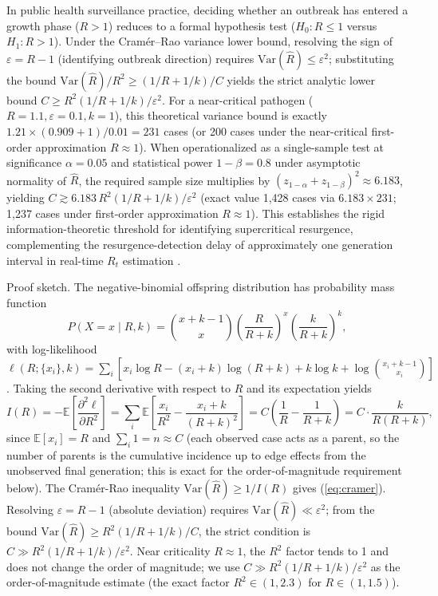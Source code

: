 \documentclass[review]{elsarticle}
\theoremstyle{plain}
\theoremstyle{definition}
\begin{document}
In public health surveillance practice, deciding whether an outbreak has entered a growth phase ($R>1$) reduces to a formal hypothesis test ($H_0: R \leq 1$ versus $H_1: R > 1$). Under the Cram\'er--Rao variance lower bound, resolving the sign of $\varepsilon = R - 1$ (identifying outbreak direction) requires $\text{Var}(\hat{R}) \le \varepsilon^2$; substituting the bound $\text{Var}(\hat{R})/R^2 \ge (1/R + 1/k)/C$ yields the strict analytic lower bound $C \ge R^2(1/R+1/k)/\varepsilon^2$. For a near-critical pathogen ($R=1.1, \varepsilon=0.1, k=1$), this theoretical variance bound is exactly $1.21 \times (0.909 + 1)/0.01 = 231$ cases (or 200 cases under the near-critical first-order approximation $R \approx 1$). When operationalized as a single-sample test at significance $\alpha=0.05$ and statistical power $1-\beta=0.8$ under asymptotic normality of $\hat{R}$, the required sample size multiplies by $(z_{1-\alpha}+z_{1-\beta})^2 \approx 6.183$, yielding $C \gtrsim 6.183 \, R^2(1/R + 1/k)/\varepsilon^2$ (exact value 1,428 cases via $6.183 \times 231$; 1,237 cases under first-order approximation $R \approx 1$). This establishes the rigid information-theoretic threshold for identifying supercritical resurgence, complementing the resurgence-detection delay of approximately one generation interval in real-time $R_t$ estimation \citep{parag2022fundamental}.

Proof sketch. The negative-binomial offspring distribution has probability mass function
\begin{equation}
P(X = x \mid R, k) = \binom{x + k - 1}{x} \left(\frac{R}{R+k}\right)^x \left(\frac{k}{R+k}\right)^k,
\end{equation}
with log-likelihood $\ell(R; \{x_i\}, k) = \sum_i [x_i \log R - (x_i + k)\log(R+k) + k\log k + \log\binom{x_i+k-1}{x_i}]$. Taking the second derivative with respect to $R$ and its expectation yields
\begin{equation}
I(R) = -\mathbb{E}\left[\frac{\partial^2 \ell}{\partial R^2}\right] = \sum_i \mathbb{E}\left[\frac{x_i}{R^2} - \frac{x_i+k}{(R+k)^2}\right] = C\left(\frac{1}{R} - \frac{1}{R+k}\right) = C \cdot \frac{k}{R(R+k)},
\end{equation}
since $\mathbb{E}[x_i] = R$ and $\sum_i 1 = n \approx C$ (each observed case acts as a parent, so the number of parents is the cumulative incidence up to edge effects from the unobserved final generation; this is exact for the order-of-magnitude requirement below). The Cramér-Rao inequality $\text{Var}(\hat{R}) \geq 1/I(R)$ gives (\ref{eq:cramer}). Resolving $\varepsilon = R - 1$ (absolute deviation) requires $\text{Var}(\hat{R}) \ll \varepsilon^2$; from the bound $\text{Var}(\hat{R}) \geq R^2(1/R+1/k)/C$, the strict condition is $C \gg R^2(1/R+1/k)/\varepsilon^2$. Near criticality $R \approx 1$, the $R^2$ factor tends to 1 and does not change the order of magnitude; we use $C \gg R^2(1/R+1/k)/\varepsilon^2$ as the order-of-magnitude estimate (the exact factor $R^2 \in (1, 2.3)$ for $R \in (1, 1.5)$).
\end{document}
